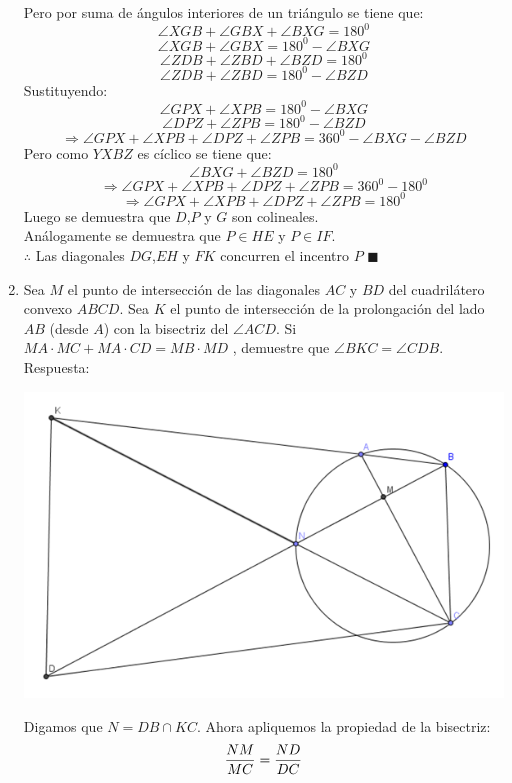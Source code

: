 \documentclass{book}
\begin{document}
\begin{enumerate}
        Pero por suma de ángulos interiores de un triángulo se tiene que:
        $$\angle XGB+\angle GBX+\angle BXG=180^0$$
        $$\angle XGB+\angle GBX=180^0-\angle BXG$$
        $$\angle ZDB+\angle ZBD+\angle BZD=180^0$$
        $$\angle ZDB+\angle ZBD=180^0-\angle BZD$$
        Sustituyendo:
        $$\angle GPX+\angle XPB=180^0-\angle BXG$$
        $$\angle DPZ+\angle ZPB=180^0-\angle BZD$$
        $$\Rightarrow\angle GPX+\angle XPB+\angle DPZ+\angle ZPB=360^0-\angle BXG-\angle BZD$$
        Pero como $YXBZ$ es cíclico se tiene que:
        $$\angle BXG+\angle BZD=180^0$$
        $$\Rightarrow\angle GPX+\angle XPB+\angle DPZ+\angle ZPB=360^0-180^0$$
        $$\Rightarrow\angle GPX+\angle XPB+\angle DPZ+\angle ZPB=180^0$$
        Luego se demuestra que $D$,$P$ y $G$ son colineales.\\
        Análogamente se demuestra que  $P\in HE$ y $P\in IF$.\\
        $\therefore$ Las diagonales $DG$,$EH$ y $FK$ concurren el incentro $P$ $\blacksquare$\\
        \item Sea $M$ el punto de intersección de las diagonales $AC$ y $BD$ del cuadrilátero convexo $ABCD$. Sea $K$ el punto de intersección de la prolongación del lado $AB$ (desde $A$) con la bisectriz del $\angle ACD$. Si $MA\cdot MC + MA\cdot CD =MB \cdot MD$ , demuestre que $\angle BKC = \angle CDB$. \\
        Respuesta:
        \begin{center}
            \includegraphics[scale=1]{imagenes/Geometria/11.png}
        \end{center}
        Digamos que $N=DB\cap KC$. Ahora apliquemos la propiedad de la bisectriz:
        $${NM\over MC}={ND\over DC}$$

\end{enumerate}
\end{document}
